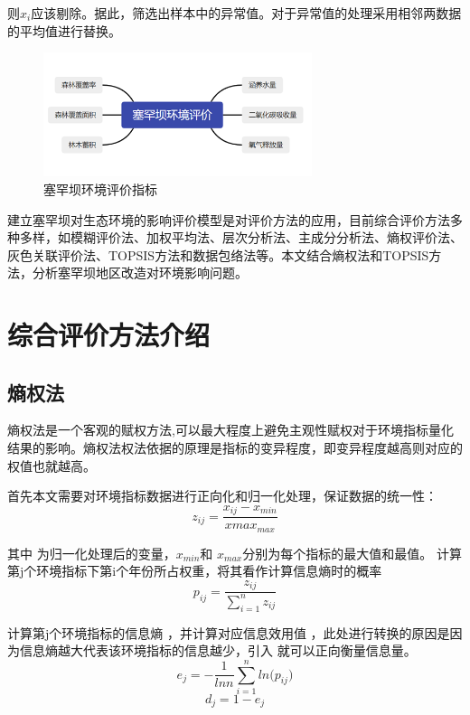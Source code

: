 \documentclass[UTF8]{ctexart}
\begin{document}
则$x_i$应该剔除。据此，筛选出样本中的异常值。对于异常值的处理采用相邻两数据的平均值进行替换。

\begin{figure}[H] %
    \centering %
    \includegraphics[width=0.7\textwidth]{./picture/saihanbapj.png} %
    \caption{塞罕坝环境评价指标} 
\end{figure}

建立塞罕坝对生态环境的影响评价模型是对评价方法的应用，目前综合评价方法多种多样，如模糊评价法、加权平均法、层次分析法、主成分分析法、熵权评价法、灰色关联评价法、TOPSIS方法和数据包络法等。本文结合熵权法和TOPSIS方法，分析塞罕坝地区改造对环境影响问题。

\newpage
\section{综合评价方法介绍}
\subsection{熵权法}
熵权法是一个客观的赋权方法,可以最大程度上避免主观性赋权对于环境指标量化结果的影响。熵权法权法依据的原理是指标的变异程度，即变异程度越高则对应的权值也就越高。

首先本文需要对环境指标数据进行正向化和归一化处理，保证数据的统一性：
\begin{equation}
    z_{ij}=\frac{x_{ij}-x_{min}}{{xmax}_{max}}
\end{equation}

其中 为归一化处理后的变量，$x_{min}$和 $x_{max}$分别为每个指标的最大值和最值。
计算第j个环境指标下第i个年份所占权重，将其看作计算信息熵时的概率 
\begin{equation}
    p_{ij}=\frac{z_{ij}}{\sum_{i=1}^{n}z_{ij}} 
\end{equation}

计算第j个环境指标的信息熵 ，并计算对应信息效用值 ，此处进行转换的原因是因为信息熵越大代表该环境指标的信息越少，引入 就可以正向衡量信息量。
\begin{equation}
    e_j=-\frac{1}{ln{n}}\sum_{i=1}^{n}{ln{(}p_{ij})}
\end{equation}
\begin{equation}
    d_j=1-e_j
\end{equation}
\end{document}
